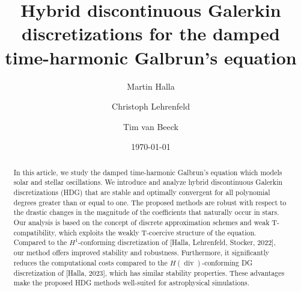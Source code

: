 \documentclass{m2an}
\renewcommand{\div}{\operatorname{div}}
\theoremstyle{plain}
\theoremstyle{definition}
\begin{document}
\title[HDG discretizations for Galbrun's equation]{Hybrid discontinuous Galerkin discretizations for the damped time-harmonic Galbrun's equation}

%
\author{Martin Halla}\address{Institute for Applied and Numerical Mathematics, Karlsruhe Institute of Technology, Englerstra{\ss}e 2, 76131 Karlsruhe, Germany; }
\author{Christoph Lehrenfeld}\address{Institute for Numerical and Applied Mathematics, University of Göttingen, Lotzestr. 16-18, 37083 Göttingen, Germany; }
\author{Tim van Beeck}

\date{\today}





%
\begin{abstract}
   In this article, we study the damped time-harmonic Galbrun's equation which models solar and stellar oscillations. We introduce and analyze hybrid discontinuous Galerkin discretizations (HDG) that are stable and optimally convergent for all polynomial degrees greater than or equal to one. The proposed methods are robust with respect to the drastic changes in the magnitude of the coefficients that naturally occur in stars. Our analysis is based on the concept of discrete approximation schemes and weak T-compatibility, which exploits the weakly T-coercive structure of the equation. Compared to the $H^1$-conforming discretization of [Halla, Lehrenfeld, Stocker, 2022], our method offers improved stability and robustness. Furthermore, it significantly reduces the computational costs compared to the $H(\div)$-conforming DG discretization of [Halla, 2023], which has similar stability properties. These advantages make the proposed HDG methods well-suited for astrophysical simulations.
\end{abstract}
%
%
%
%
\end{document}
